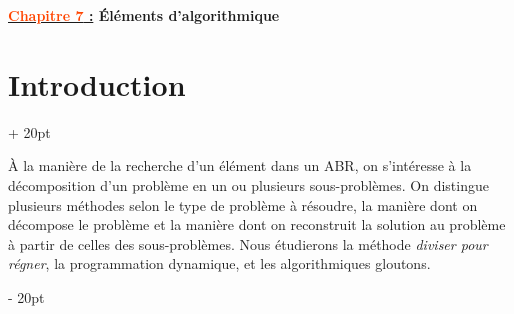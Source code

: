 \documentclass[a4paper, 12pt, twoside]{article}
\renewcommand{\emph}{\textcolor{ff4500}}
\newcommand{\ind}[1][20pt]{\advance\leftskip + #1}
\newcommand{\deind}[1][20pt]{\advance\leftskip - #1}
\newenvironment{indt}[2][20pt]{#2 \par \ind[#1]}{\par \deind} %
\newcommand{\thetitle}[2]{\begin{center}\textbf{{\LARGE \underline{\emph{#1} :}} {\Large #2}}\end{center}}
\begin{document}
    
    
    \thetitle{Chapitre 7}{\'Eléments d'algorithmique}
    
    \tableofcontents
    \newpage
    
    
    \begin{indt}{\section{Introduction}}
        
        \`A la manière de la recherche d'un élément dans un ABR, on s'intéresse à la décomposition d'un problème en un ou plusieurs sous-problèmes. On distingue plusieurs méthodes selon le type de problème à résoudre, la manière dont on décompose le problème et la manière dont on reconstruit la solution au problème à partir de celles des sous-problèmes. Nous étudierons la méthode \textit{diviser pour régner}, la programmation dynamique, et les algorithmiques gloutons.
        
    \end{indt}
    
    \vspace{12pt}
    
\end{document}
